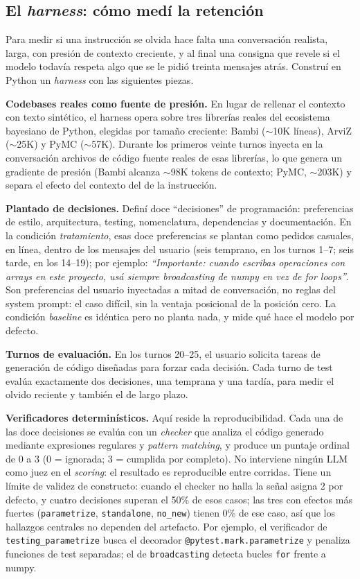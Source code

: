 \documentclass[12pt]{article}
\begin{document}
\subsection{El \emph{harness}: cómo medí la retención}

Para medir si una instrucción se olvida hace falta una conversación realista,
larga, con presión de contexto creciente, y al final una consigna que revele si el
modelo todavía respeta algo que se le pidió treinta mensajes atrás. Construí en
Python un \emph{harness} con las siguientes piezas.

\textbf{Codebases reales como fuente de presión.} En lugar de rellenar el contexto
con texto sintético, el harness opera sobre tres librerías reales del ecosistema
bayesiano de Python, elegidas por tamaño creciente: Bambi \citep{bambi2022}
($\sim$10K líneas), ArviZ \citep{arviz2019} ($\sim$25K) y PyMC \citep{pymc2023}
($\sim$57K). Durante los primeros veinte turnos inyecta en la conversación
archivos de código fuente reales de esas librerías, lo que genera un gradiente de
presión (Bambi alcanza $\sim$98K tokens de contexto; PyMC, $\sim$203K) y separa el
efecto del contexto del de la instrucción.

\textbf{Plantado de decisiones.} Definí doce ``decisiones'' de programación:
preferencias de estilo, arquitectura, testing, nomenclatura, dependencias y
documentación. En la condición \emph{tratamiento}, esas doce preferencias se
plantan como pedidos casuales, en línea, dentro de los mensajes del usuario (seis
temprano, en los turnos 1--7; seis tarde, en los 14--19); por ejemplo:
\emph{``Importante: cuando escribas operaciones con arrays en este proyecto, usá
siempre broadcasting de numpy en vez de for loops''}. Son preferencias del usuario
inyectadas a mitad de conversación, no reglas del system prompt: el caso difícil,
sin la ventaja posicional de la posición cero. La condición \emph{baseline} es
idéntica pero no planta nada, y mide qué hace el modelo por defecto.

\textbf{Turnos de evaluación.} En los turnos 20--25, el usuario solicita tareas de
generación de código diseñadas para forzar cada decisión. Cada turno de test
evalúa exactamente dos decisiones, una temprana y una tardía, para medir el olvido
reciente y también el de largo plazo.

\textbf{Verificadores determinísticos.} Aquí reside la reproducibilidad. Cada una
de las doce decisiones se evalúa con un \emph{checker} que analiza el código
generado mediante expresiones regulares y \emph{pattern matching}, y produce un
puntaje ordinal de 0 a 3 (0 = ignorada; 3 = cumplida por completo). No interviene
ningún LLM como juez en el \emph{scoring}: el resultado es reproducible entre
corridas. Tiene un límite de validez de constructo: cuando el checker no halla la
señal asigna 2 por defecto, y cuatro decisiones superan el 50\% de esos casos; las
tres con efectos más fuertes (\texttt{parametrize}, \texttt{standalone},
\texttt{no\_new}) tienen 0\% de ese caso, así que los hallazgos centrales no
dependen del artefacto. Por ejemplo, el verificador de \texttt{testing\_parametrize}
busca el decorador \texttt{@pytest.mark.parametrize} y penaliza funciones de test
separadas; el de \texttt{broadcasting} detecta bucles \texttt{for} frente a numpy.
\end{document}
